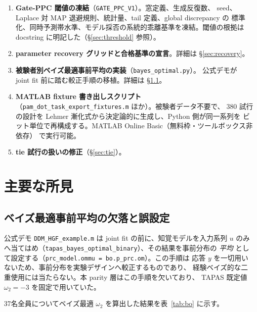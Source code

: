 \documentclass[11pt]{ltjsarticle}
\newcommand{\code}[1]{\texttt{#1}}
\begin{document}
\begin{enumerate}[leftmargin=1.4em]
  \item \textbf{Gate-PPC 閾値の凍結}（\code{GATE\_PPC\_V1}）。窓定義、生成反復数、
        seed、Laplace 対 MAP 退避規則、統計量、tail 定義、global discrepancy の
        標準化、同時予測帯水準、モデル採否の系統的乖離基準を凍結。閾値の根拠は
        docstring に明記した（\S\ref{sec:threshold} 参照）。
  \item \textbf{parameter recovery グリッドと合格基準の宣言}。詳細は
        \S\ref{sec:recovery}。
  \item \textbf{被験者別ベイズ最適事前平均の実装}（\code{bayes\_optimal.py}）。
        公式デモが joint fit 前に踏む較正手順の移植。詳細は \S\ref{sec:bayesopt}。
  \item \textbf{MATLAB fixture 書き出しスクリプト}
        （\code{pam\_dot\_task\_export\_fixtures.m} ほか）。被験者データ不要で、
        380 試行の設計を Lehmer 漸化式から決定論的に生成し、Python 側が同一系列を
        ビット単位で再構成する。MATLAB Online Basic（無料枠・ツールボックス非依存）
        で実行可能。
  \item \textbf{tie 試行の扱いの修正}（\S\ref{sec:tie}）。
\end{enumerate}

\section{主要な所見}

\subsection{ベイズ最適事前平均の欠落と誤設定}
\label{sec:bayesopt}

公式デモ \code{DDM\_HGF\_example.m} は joint fit の前に、知覚モデルを入力系列
\(u\) のみへ当てはめ（\code{tapas\_bayes\_optimal\_binary}）、その結果を事前分布の
\emph{平均} として設定する（\code{prc\_model.ommu = bo.p\_prc.om}）。この手順は
応答 \(y\) を一切用いないため、事前分布を実験デザインへ較正するものであり、
経験ベイズ的な二重使用には当たらない。本 parity 層はこの手順を欠いており、
TAPAS 既定値 \(\omega_2 = -3\) を固定で用いていた。

37名全員についてベイズ最適 \(\omega_2\) を算出した結果を表~\ref{tab:bo} に示す。
\end{document}
